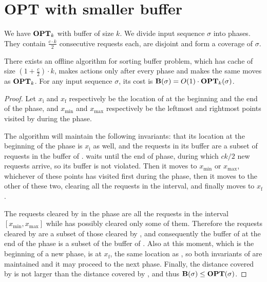 \section{OPT with smaller buffer}
We have $\operatorname{\mathbf{OPT}}_k$ with buffer of size $k$. We divide input sequence $\sigma$ into
phases. They contain $\frac{c \cdot k}{2}$ consecutive requests each, are
disjoint and form a coverage of $\sigma$.

\begin{lemma}\label{lem:algorithm_B}
There exists an offline algorithm \fazowy{} for sorting buffer problem, which
has cache of size $(1 + \frac{c}{2}) \cdot k$, makes actions only after every
phase and makes the same moves as $\operatorname{\mathbf{OPT}}_k$. For any input sequence $\sigma$, its
cost is $\operatorname{\mathbf{B}}(\sigma) = O(1) \cdot \operatorname{\mathbf{OPT}}_k(\sigma)$.
\end{lemma}

\begin{proof}
Let $x_\text{i}$ and $x_\text{f}$ respectively be the location of \opt{} at 
the beginning and the end of the phase, and $x_\text{min}$ and $x_\text{max}$ 
respectively be the leftmost and rightmost points visited by \opt{} during the 
phase.

The algorithm \fazowy{} will maintain the following invariants: that its 
location at the beginning of the phase is $x_\text{i}$ as well, and the 
requests in its buffer are a subset of requests in the buffer of \opt. 
\fazowy{} waits until the end of phase, during which $ck/2$ new requests 
arrive, so its buffer is not violated. Then it moves to $x_\text{min}$ or 
$x_\text{max}$, whichever of these points \opt{} has visited first during the 
phase, then it moves to the other of these two, clearing all the requests in 
the interval, and finally moves to $x_\text{f}$.

The requests cleared by \fazowy{} in the phase are all the requests in the 
interval $[x_\text{min},x_\text{max}]$ while \opt{} has possibly cleared only 
some of them.
Therefore the requests cleared by \opt{} are a subset of those cleared by 
\fazowy, and consequently the buffer of \fazowy{} at the end of the phase is a 
subset of the buffer of \opt. Also at this moment, which is the beginning of a 
new phase, \fazowy{} is at $x_\text{f}$, the same location as \opt, so both 
invariants of \fazowy{} are maintained and it may proceed to the next phase. 
Finally, the distance covered by \fazowy{} is not larger than the distance 
covered by \opt{}, and thus $\operatorname{\mathbf{B}}(\sigma) \leq \operatorname{\mathbf{OPT}}(\sigma)$.
\end{proof}

